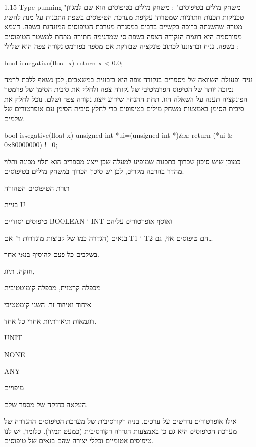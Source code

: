      1.15 Type punning "משחק מילים בטיפוסים" :
      משחק מילים בטיפוסים הוא שם למגוון טכניקות תכנות חתרניות שמטרתן עקיפת מערכת הטיפוסים בשפת התכנות על מנת להשיג מטרה שהשגתה כרוכה בקשיים ברבים במסגרת מערכת הטיפוסים המונהגת בשפה.
      דוגמא מפורסמת היא דוגמת הנקודה הצפה בשפת סי שמדגימה חתירה מתחת למשטר הטיפוסים בשפה.
      נניח וברצוננו לכתוב פונקציה שבודקת אם מספר בפורמט נקודה צפה הוא שלילי :
\begin{CPP}
bool isnegative(float x) {
   return x < 0.0;
}
\end{CPP}
      נניח ופעולת השוואה של מספרים בנקודה צפה היא בזבזנית במשאבים, לכן נשאף ללכת לרמה נמוכה יותר של הטיפוס הפרמיטיבי של נקודה צפה ולחלץ את סיבית הסימן של פרמטר הפונקציה תענה על השאלה הזו. תחת ההנחה שידוע ייצוג נקודה צפה ושלם, נוכל לחלץ את סיבית הסימן באמצעות משחק מילים בטיפוסים כדי לחלץ סיבית הסימן עם אופרטורים של שלמים.
\begin{CPP}
bool isₙegative(float x) {
  unsigned int *ui=(unsigned int *)&x;
  return (*ui & 0x80000000) !=0;
}
\end{CPP}
      כמובן שיש סיכון שכרוך בתכנות שמופיע למעלה שכן ייצוג מספרים הוא תלוי מכונה ותלוי מהדר בהרבה מקרים, לכן יש סיכון הכרוך במשחק מילים בטיפוסים.

      תורת הטיפוסים הטהורה

      \begin{ציינון}
\item בניית U
\item טיפוסים יסודיים BOOLEAN ו-INT ואוסף אופרטורים עליהם
\item בנאים (הגדרה כמו של קבוצות מוגדרות ר' אם T1 ו-T2 הם טיפוסים אזי, גם…
\item בשלבים כל פעם להוסיף בנאי אחר.
\item חזקה, תיוג,
\item מכפלה קרטזית, מכפלה קומוטטיבית
\item איחוד ואיחוד זר. השני קומטטיבי
\item דוגמאות תיאורתיות אחרי כל אחד.
\item UNIT
\item NONE
\item ANY
\item מיפויים
\item העלאה בחזקה של מספר שלם.
\item אילו אופרטורים נדרשים על ערכים.
      בניה רקורסיבית של מערכת הטיפוסים
      ההגדרה של מערכת הטיפוסים היא גם כן באמצעות הגדרה רקורסיבית (כמעט תמיד). כלומר, יש לנו טיפוסים אטומיים וכללי יצירה שהם בנאים של טיפוסים.
  \end{ציינון}

